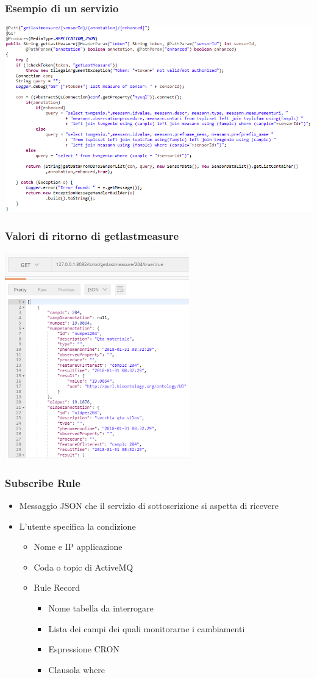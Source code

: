\documentclass{beamer}
\begin{document}
\begin{frame}
\frametitle{Esempio di un servizio}
\includegraphics[width=1\textwidth]{images/getlastmeasure.png}
\end{frame}

\begin{frame}
\frametitle{Valori di ritorno di getlastmeasure}
\includegraphics[width=0.6\textwidth]{images/Postman1.png}
\end{frame}

\begin{frame}
\frametitle{Subscribe Rule}
\begin{itemize}
\item Messaggio JSON che il servizio di sottoscrizione si aspetta di ricevere
\item L'utente specifica la condizione
\begin{itemize}
\item Nome e IP applicazione
\item Coda o topic di ActiveMQ
\item Rule Record
\begin{itemize}
\item Nome tabella da interrogare
\item Lista dei campi dei quali monitorarne i cambiamenti
\item Espressione CRON
\item Clausola where

\end{itemize}
\end{itemize}
\end{itemize}
\end{frame}
\end{document}
